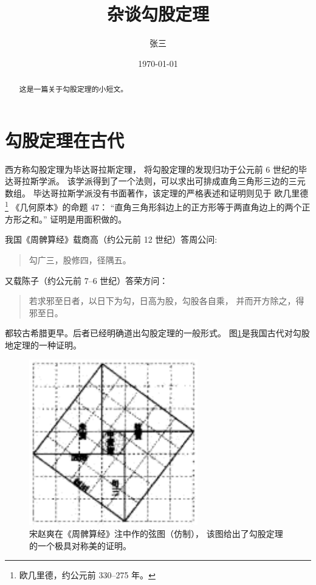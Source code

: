 \documentclass[UTF8]{ctexart}
\title{\heiti 杂谈勾股定理}
\author{\kaishu 张三}
\date{\today}
\newenvironment{myquote}
{\begin{quote}\kaishu\zihao{-5}}
{\end{quote}}
\begin{document}
\maketitle
\begin{abstract}
        这是一篇关于勾股定理的小短文。
\end{abstract}

\tableofcontents
\section{勾股定理在古代}
        西方称勾股定理为毕达哥拉斯定理，
        将勾股定理的发现归功于公元前 6 世纪的毕达哥拉斯学派\cite{Kline}。
        该学派得到了一个法则，可以求出可排成直角三角形三边的三元数组。
        毕达哥拉斯学派没有书面著作，该定理的严格表述和证明则见于
        欧几里德\footnote{欧几里德，约公元前 330--275 年。}
        《几何原本》的命题 47：
        “直角三角形斜边上的正方形等于两直角边上的两个正方形之和。”
        证明是用面积做的。

        我国《周髀算经》载商高（约公元前 12 世纪）答周公问:
        \begin{myquote}
                勾广三，股修四，径隅五。
        \end{myquote}
        又载陈子（约公元前 7--6 世纪）答荣方问：
        \begin{myquote}
                若求邪至日者，以日下为勾，日高为股，勾股各自乘，
                并而开方除之，得邪至日。
        \end{myquote}
        都较古希腊更早。后者已经明确道出勾股定理的一般形式。
        图\ref{fig:xiantu}是我国古代对勾股地定理的一种证明\cite{quanjing}。
	\begin{figure}[ht]
	        \centering
	        \includegraphics[scale=0.6]{xiantu.png}
	        \caption{宋赵爽在《周髀算经》注中作的弦图（仿制），
	                该图给出了勾股定理的一个极具对称美的证明。}
	        \label{fig:xiantu}
	\end{figure}
\end{document}
